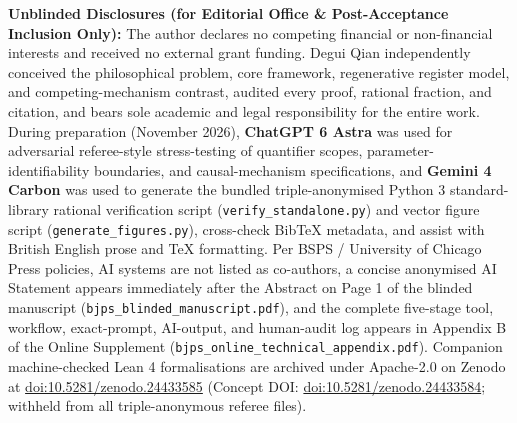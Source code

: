 \documentclass[11pt,letterpaper]{article}
\begin{document}
\vspace{10pt}
\noindent\textbf{Unblinded Disclosures (for Editorial Office \& Post-Acceptance Inclusion Only):}
The author declares no competing financial or non-financial interests and received no external grant funding. Degui Qian independently conceived the philosophical problem, core framework, regenerative register model, and competing-mechanism contrast, audited every proof, rational fraction, and citation, and bears sole academic and legal responsibility for the entire work. During preparation (November 2026), \textbf{ChatGPT 6 Astra} was used for adversarial referee-style stress-testing of quantifier scopes, parameter-identifiability boundaries, and causal-mechanism specifications, and \textbf{Gemini 4 Carbon} was used to generate the bundled triple-anonymised Python 3 standard-library rational verification script (\texttt{verify\_standalone.py}) and vector figure script (\texttt{generate\_figures.py}), cross-check BibTeX metadata, and assist with British English prose and \TeX{} formatting. Per BSPS / University of Chicago Press policies, AI systems are not listed as co-authors, a concise anonymised AI Statement appears immediately after the Abstract on Page 1 of the blinded manuscript (\texttt{bjps\_blinded\_manuscript.pdf}), and the complete five-stage tool, workflow, exact-prompt, AI-output, and human-audit log appears in Appendix B of the Online Supplement (\texttt{bjps\_online\_technical\_appendix.pdf}). Companion machine-checked Lean 4 formalisations are archived under Apache-2.0 on Zenodo at \href{https://doi.org/10.5281/zenodo.24433585}{doi:10.5281/zenodo.24433585} (Concept DOI: \href{https://doi.org/10.5281/zenodo.24433584}{doi:10.5281/zenodo.24433584}; withheld from all triple-anonymous referee files).
\end{document}
